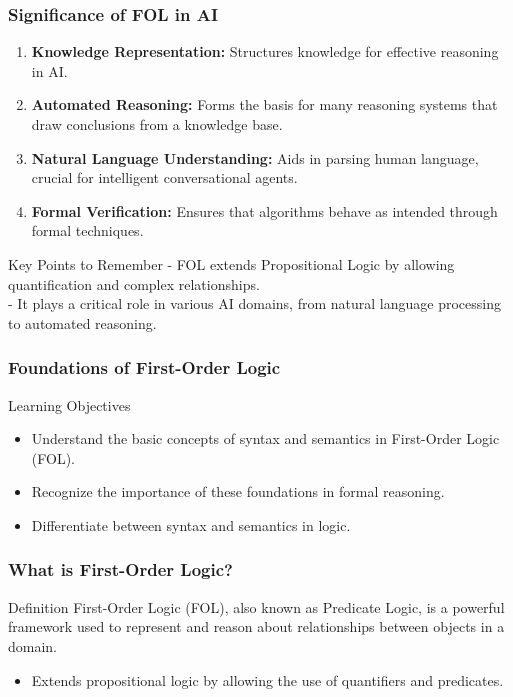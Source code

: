 \documentclass[aspectratio=169]{beamer}
\begin{document}
\begin{frame}[fragile]
    \frametitle{Significance of FOL in AI}
    \begin{enumerate}
        \item \textbf{Knowledge Representation:} Structures knowledge for effective reasoning in AI.
        
        \item \textbf{Automated Reasoning:} Forms the basis for many reasoning systems that draw conclusions from a knowledge base.
        
        \item \textbf{Natural Language Understanding:} Aids in parsing human language, crucial for intelligent conversational agents.
        
        \item \textbf{Formal Verification:} Ensures that algorithms behave as intended through formal techniques.
    \end{enumerate}
    
    \begin{block}{Key Points to Remember}
        - FOL extends Propositional Logic by allowing quantification and complex relationships.\\
        - It plays a critical role in various AI domains, from natural language processing to automated reasoning.
    \end{block}
\end{frame}

\begin{frame}[fragile]
    \frametitle{Foundations of First-Order Logic}
    \begin{block}{Learning Objectives}
        \begin{itemize}
            \item Understand the basic concepts of syntax and semantics in First-Order Logic (FOL).
            \item Recognize the importance of these foundations in formal reasoning.
            \item Differentiate between syntax and semantics in logic.
        \end{itemize}
    \end{block}
\end{frame}

\begin{frame}[fragile]
    \frametitle{What is First-Order Logic?}
    \begin{block}{Definition}
        First-Order Logic (FOL), also known as Predicate Logic, is a powerful framework used to represent and reason about relationships between objects in a domain.
    \end{block}
    \begin{itemize}
        \item Extends propositional logic by allowing the use of quantifiers and predicates.
    \end{itemize}
\end{frame}
\end{document}
